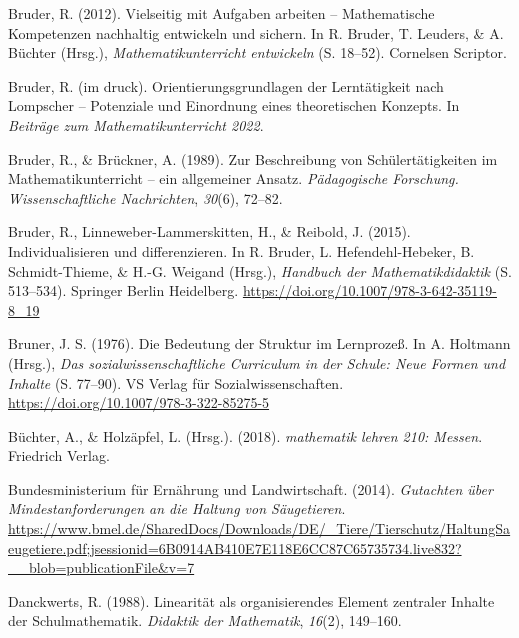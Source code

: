 \documentclass[
]{scrbook}
\newlength{\cslhangindent}
\newlength{\cslentryspacingunit} %
\newenvironment{CSLReferences}[2] %
 {%
  \setlength{\parindent}{0pt}
  \ifodd #1
  \let\oldpar\par
  \def\par{\hangindent=\cslhangindent\oldpar}
  \fi
  \setlength{\parskip}{#2\cslentryspacingunit}
 }%
 {}
\theoremstyle{definition}
\theoremstyle{definition}
\theoremstyle{definition}
\theoremstyle{definition}
\theoremstyle{remark}
\begin{document}
\begin{CSLReferences}{1}{0}
\leavevmode{}%
Bruder, R. (2012). Vielseitig mit {Aufgaben} arbeiten -- {Mathematische} {Kompetenzen} nachhaltig entwickeln und sichern. In R. Bruder, T. Leuders, \& A. Büchter (Hrsg.), \emph{Mathematikunterricht entwickeln} (S. 18--52). Cornelsen Scriptor.

\leavevmode{}%
Bruder, R. (im {d}ruck). Orientierungsgrundlagen der {Lerntätigkeit} nach {Lompscher} -- {Potenziale} und {Einordnung} eines theoretischen {Konzepts}. In \emph{Beiträge zum {Mathematikunterricht} 2022}.

\leavevmode{}%
Bruder, R., \& Brückner, A. (1989). Zur {Beschreibung} von {Schülertätigkeiten} im {Mathematikunterricht} -- ein allgemeiner {Ansatz}. \emph{Pädagogische Forschung. Wissenschaftliche Nachrichten}, \emph{30}(6), 72--82.

\leavevmode{}%
Bruder, R., Linneweber-Lammerskitten, H., \& Reibold, J. (2015). Individualisieren und differenzieren. In R. Bruder, L. Hefendehl-Hebeker, B. Schmidt-Thieme, \& H.-G. Weigand (Hrsg.), \emph{Handbuch der {Mathematikdidaktik}} (S. 513--534). Springer Berlin Heidelberg. \url{https://doi.org/10.1007/978-3-642-35119-8_19}

\leavevmode{}%
Bruner, J. S. (1976). Die {Bedeutung} der {Struktur} im {Lernprozeß}. In A. Holtmann (Hrsg.), \emph{Das sozialwissenschaftliche {Curriculum} in der {Schule}: {Neue} {Formen} und {Inhalte}} (S. 77--90). VS Verlag für Sozialwissenschaften. \url{https://doi.org/10.1007/978-3-322-85275-5}

\leavevmode{}%
Büchter, A., \& Holzäpfel, L. (Hrsg.). (2018). \emph{mathematik lehren 210: Messen}. Friedrich Verlag.

\leavevmode{}%
Bundesministerium für Ernährung und Landwirtschaft. (2014). \emph{Gutachten über {Mindestanforderungen} an die {Haltung} von {Säugetieren}}. \url{https://www.bmel.de/SharedDocs/Downloads/DE/_Tiere/Tierschutz/HaltungSaeugetiere.pdf;jsessionid=6B0914AB410E7E118E6CC87C65735734.live832?__blob=publicationFile\&v=7}

\leavevmode{}%
Danckwerts, R. (1988). Linearität als organisierendes Element zentraler Inhalte der Schulmathematik. \emph{Didaktik der Mathematik}, \emph{16}(2), 149--160.


\end{CSLReferences}
\end{document}
